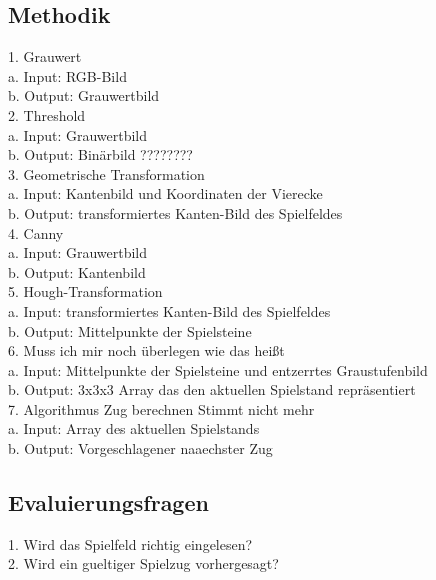 \documentclass[paper=A4, deutsch]{scrartcl}
\begin{document}
\subsection{Methodik}
1. Grauwert\\
\hspace*{1em} a. Input: RGB-Bild\\
\hspace*{1em} 	b. Output: Grauwertbild \\
2.  Threshold\\
\hspace*{1em} a. Input: Grauwertbild\\
\hspace*{1em} b. Output: Binärbild ???????? \\
3. Geometrische Transformation\\
\hspace*{1em} a. Input: Kantenbild und Koordinaten der Vierecke\\
\hspace*{1em} b. Output: transformiertes Kanten-Bild des Spielfeldes \\
4. Canny\\
\hspace*{1em} a. Input: Grauwertbild\\
\hspace*{1em} b. Output: Kantenbild \\
5. Hough-Transformation \\
\hspace*{1em} a. Input: transformiertes Kanten-Bild des Spielfeldes\\
\hspace*{1em} b. Output: Mittelpunkte der Spielsteine \\
6. Muss ich mir noch überlegen wie das heißt  \\
\hspace*{1em} a. Input: Mittelpunkte der Spielsteine und entzerrtes Graustufenbild\\
\hspace*{1em} b. Output: 3x3x3 Array das den aktuellen Spielstand repräsentiert \\
7. Algorithmus Zug berechnen Stimmt nicht mehr\\
\hspace*{1em} a. Input: Array des aktuellen Spielstands \\
\hspace*{1em} b. Output: Vorgeschlagener naaechster Zug

\subsection{Evaluierungsfragen}
1. Wird das Spielfeld richtig eingelesen?\\
2. Wird ein gueltiger Spielzug vorhergesagt?\\
\end{document}
